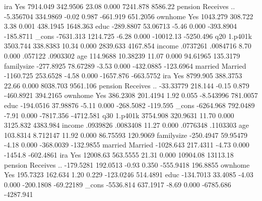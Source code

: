              {\VBAR}
         ira {\VBAR}
        Yes  {\VBAR}   7914.049   342.9506    23.08   0.000     7241.878     8586.22
             {\VBAR}
     pension {\VBAR}
Receives ..  {\VBAR}  -5.356704   334.9869    -0.02   0.987     -661.919    651.2056
             {\VBAR}
     ownhome {\VBAR}
        Yes  {\VBAR}   1043.279    308.722     3.38   0.001     438.1945    1648.363
        educ {\VBAR}  -289.8807   53.06713    -5.46   0.000    -393.8904   -185.8711
       _cons {\VBAR}  -7631.313   1214.725    -6.28   0.000    -10012.13   -5250.496
q20          {\VBAR}
     1.p401k {\VBAR}   3503.744   338.8383    10.34   0.000     2839.633    4167.854
      income {\VBAR}   .0737261   .0084716     8.70   0.000      .057122    .0903302
         age {\VBAR}   114.9688   10.38239    11.07   0.000     94.61965    135.3179
  familysize {\VBAR}  -277.8925   78.67289    -3.53   0.000    -432.0885   -123.6964
             {\VBAR}
     married {\VBAR}
    Married  {\VBAR}  -1160.725   253.6528    -4.58   0.000    -1657.876   -663.5752
             {\VBAR}
         ira {\VBAR}
        Yes  {\VBAR}   8799.905   388.3753    22.66   0.000     8038.703    9561.106
             {\VBAR}
     pension {\VBAR}
Receives ..  {\VBAR}  -33.33779    218.144    -0.15   0.879    -460.8921    394.2165
             {\VBAR}
     ownhome {\VBAR}
        Yes  {\VBAR}   386.2308   201.4194     1.92   0.055    -8.543996    781.0057
        educ {\VBAR}  -194.0516   37.98876    -5.11   0.000    -268.5082    -119.595
       _cons {\VBAR}  -6264.968   792.0489    -7.91   0.000    -7817.356   -4712.581
q30          {\VBAR}
     1.p401k {\VBAR}   3754.908   320.9631    11.70   0.000     3125.832    4383.984
      income {\VBAR}   .0939826   .0083408    11.27   0.000     .0776348    .1103303
         age {\VBAR}   103.8314   8.712147    11.92   0.000     86.75593    120.9069
  familysize {\VBAR}  -250.4947   59.95479    -4.18   0.000    -368.0039   -132.9855
             {\VBAR}
     married {\VBAR}
    Married  {\VBAR}  -1028.643   217.4311    -4.73   0.000      -1454.8   -602.4861
             {\VBAR}
         ira {\VBAR}
        Yes  {\VBAR}   12008.63   563.5555    21.31   0.000     10904.08    13113.18
             {\VBAR}
     pension {\VBAR}
Receives ..  {\VBAR}  -179.5281   192.0513    -0.93   0.350    -555.9418    196.8855
             {\VBAR}
     ownhome {\VBAR}
        Yes  {\VBAR}   195.7323    162.634     1.20   0.229    -123.0246    514.4891
        educ {\VBAR}  -134.7013    33.4085    -4.03   0.000    -200.1808   -69.22189
       _cons {\VBAR}  -5536.814   637.1917    -8.69   0.000    -6785.686   -4287.941
